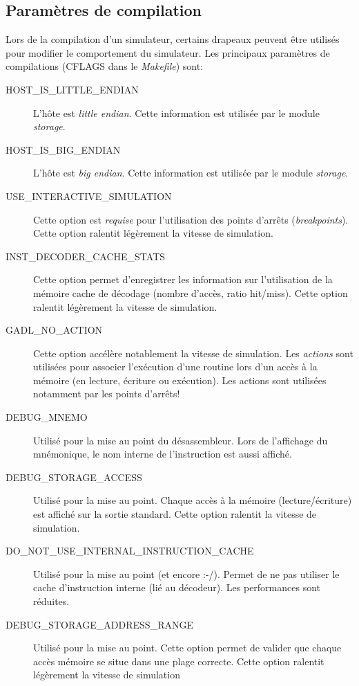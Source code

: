 \subsection{Paramètres de compilation}
\label{sec:cflags}
Lors de la compilation d'un simulateur, certains drapeaux peuvent être utilisés pour modifier le comportement du simulateur. 
Les principaux paramètres de compilations (CFLAGS dans le \emph{Makefile}) sont:
\begin{description}
\item[HOST\_IS\_LITTLE\_ENDIAN] L'hôte est \emph{little endian}. Cette information est utilisée par le module \emph{storage}.
\item[HOST\_IS\_BIG\_ENDIAN] L'hôte est \emph{big endian}. Cette information est utilisée par le module \emph{storage}.
\item[USE\_INTERACTIVE\_SIMULATION] Cette option est \emph{requise} pour l'utilisation des points d'arrêts (\emph{breakpoints}). Cette option ralentit légèrement la vitesse de simulation.
\item[INST\_DECODER\_CACHE\_STATS] Cette option permet d'enregistrer les information sur l'utilisation de la mémoire cache de décodage (nombre d'accès, ratio hit/miss). Cette option ralentit légèrement la vitesse de simulation.
\item[GADL\_NO\_ACTION] Cette option accélère notablement la vitesse de simulation. Les \emph{actions} sont utilisées pour associer l'exécution d'une routine lors d'un accès à la mémoire (en lecture, écriture ou exécution). Les actions sont utilisées notamment par les points d'arrêts!
\item[DEBUG\_MNEMO] Utilisé pour la mise au point du désassembleur. Lors de l'affichage du mnémonique, le nom interne de l'instruction est aussi affiché.
\item[DEBUG\_STORAGE\_ACCESS] Utilisé pour la mise au point. Chaque accès à la mémoire (lecture/écriture) est affiché sur la sortie standard. Cette option ralentit la vitesse de simulation.
\item[DO\_NOT\_USE\_INTERNAL\_INSTRUCTION\_CACHE] Utilisé pour la mise au point (et encore :-/). Permet de ne pas utiliser le cache d'instruction interne (lié au décodeur). Les performances sont réduites.
\item[DEBUG\_STORAGE\_ADDRESS\_RANGE] Utilisé pour la mise au point. Cette option permet de valider que chaque accès mémoire se situe dans une plage correcte. Cette option ralentit légèrement la vitesse de simulation
\end{description}

